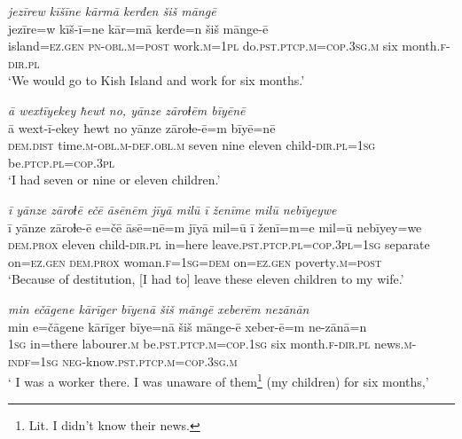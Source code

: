 \ea \label{ŽM.25}
\textit{jezīrew kīšīne kārmā kerđen šiš māngē} \\ 
\gll jezīre=w kīš-ī=ne kār=mā kerđe=n šiš mānge-ē \\ 
 island\textsc{=ez.gen} \textsc{pn}\textsc{-obl}\textsc{.m}\textsc{=\textsc{post}} work\textsc{.m}\textsc{=\textsc{1pl}} do\textsc{.pst}\textsc{.ptcp}\textsc{.m}\textsc{=cop}\textsc{.3sg}\textsc{.m} six month\textsc{.f}\textsc{-dir}\textsc{.pl} \\ 
\glt `We would go to Kish Island and work for six months.'
\z 
 
\ea \label{ŽM.26}
\textit{ā wextīyekey ħewt no, yānze zāroɫēm bīyēnē} \\ 
\gll ā wext-ī-ekey ħewt no yānze zāroɫe-ē=m bīyē=nē \\ 
 \textsc{dem.dist} time\textsc{.m}\textsc{-obl}\textsc{.m}\textsc{-def}\textsc{.obl}\textsc{.m} seven nine eleven child\textsc{-dir}\textsc{.pl}\textsc{=\textsc{1sg}} be\textsc{.ptcp}\textsc{.pl}\textsc{=cop}\textsc{.3pl} \\ 
\glt `I had seven or nine or eleven children.'
\z 
 
\ea \label{ŽM.27}
\textit{ī yānze zāroɫē ečē āsēnēm jīyā milū ī ženīme milū nebīyeywe} \\ 
\gll ī yānze zāroɫe-ē e=čē āsē=nē=m jīyā mil=ū ī ženī=m=e mil=ū nebīyey=we \\ 
 \textsc{dem.prox} eleven child\textsc{-dir}\textsc{.pl} in=here leave\textsc{.pst}\textsc{.ptcp}\textsc{.pl}\textsc{=cop}\textsc{.3pl}\textsc{=\textsc{1sg}} separate on\textsc{=ez.gen} \textsc{dem.prox} woman\textsc{.f}\textsc{=\textsc{1sg}}\textsc{=dem} on\textsc{=ez.gen} poverty\textsc{.m}\textsc{=\textsc{post}} \\ 
\glt `Because of destitution, [I had to] leave these eleven children to my wife.'
\z 
 
\ea \label{ŽM.28}
\textit{min ečāgene kārīger bīyenā šiš māngē xeberēm nezānān} \\ 
\gll min e=čāgene kārīger bīye=nā šiš mānge-ē xeber-ē=m ne-zānā=n \\ 
 \textsc{1sg} in=there labourer\textsc{.m} be\textsc{.pst}\textsc{.ptcp}\textsc{.m}\textsc{=cop}\textsc{.\textsc{1sg}} six month\textsc{.f}\textsc{-dir}\textsc{.pl} news\textsc{.m}\textsc{-indf}\textsc{=\textsc{1sg}} \textsc{neg-}know\textsc{.pst}\textsc{.ptcp}\textsc{.m}\textsc{=cop}\textsc{.3sg}\textsc{.m} \\ 
\glt ` I was a worker there. I was unaware of them\footnote{Lit. I didn’t know their news.}  (my children) for six months,'
\z 
 

